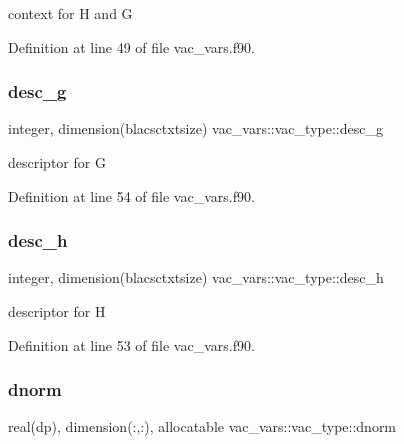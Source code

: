 context for H and G 



Definition at line 49 of file vac\+\_\+vars.\+f90.

\mbox{\label{structvac__vars_1_1vac__type_a8c1903cbdc406915f473535daa1cafb7}} 
\subsubsection{\texorpdfstring{desc\+\_\+g}{desc\_g}}
{\footnotesize\ttfamily integer, dimension(blacsctxtsize) vac\+\_\+vars\+::vac\+\_\+type\+::desc\+\_\+g}



descriptor for G 



Definition at line 54 of file vac\+\_\+vars.\+f90.

\mbox{\label{structvac__vars_1_1vac__type_a7d588dd9ece3c1a645329431769c28de}} 
\subsubsection{\texorpdfstring{desc\+\_\+h}{desc\_h}}
{\footnotesize\ttfamily integer, dimension(blacsctxtsize) vac\+\_\+vars\+::vac\+\_\+type\+::desc\+\_\+h}



descriptor for H 



Definition at line 53 of file vac\+\_\+vars.\+f90.

\mbox{\label{structvac__vars_1_1vac__type_a7703921b8900d9886904fd51e8cba073}} 
\subsubsection{\texorpdfstring{dnorm}{dnorm}}
{\footnotesize\ttfamily real(dp), dimension(\+:,\+:), allocatable vac\+\_\+vars\+::vac\+\_\+type\+::dnorm}



